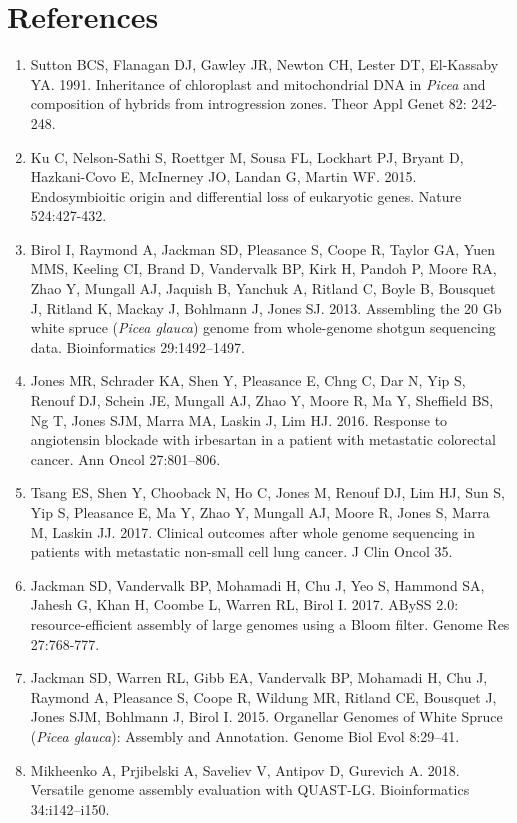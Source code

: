 \documentclass[titlepage,11pt, oneside]{article}   	%
\begin{document}
\section*{References}
\begin{enumerate}
\item Sutton BCS, Flanagan DJ, Gawley JR, Newton CH, Lester DT, El-Kassaby YA. 1991. Inheritance of chloroplast and mitochondrial DNA in \textit{Picea} and composition of hybrids from introgression zones. Theor Appl Genet 82: 242-248.
\item Ku C, Nelson-Sathi S, Roettger M, Sousa FL, Lockhart PJ, Bryant D, Hazkani-Covo E, McInerney JO, Landan G, Martin WF. 2015. Endosymbioitic origin and differential loss of eukaryotic genes. Nature 524:427-432.
\item Birol I, Raymond A, Jackman SD, Pleasance S, Coope R, Taylor GA, Yuen MMS, Keeling CI, Brand D, Vandervalk BP, Kirk H, Pandoh P, Moore RA, Zhao Y, Mungall AJ, Jaquish B, Yanchuk A, Ritland C, Boyle B, Bousquet J, Ritland K, Mackay J, Bohlmann J, Jones SJ. 2013. Assembling the 20 Gb white spruce (\textit{Picea glauca}) genome from whole-genome shotgun sequencing data. Bioinformatics 29:1492–1497.
\item Jones MR, Schrader KA, Shen Y, Pleasance E, Chng C, Dar N, Yip S, Renouf DJ, Schein JE, Mungall AJ, Zhao Y, Moore R, Ma Y, Sheffield BS, Ng T, Jones SJM, Marra MA, Laskin J, Lim HJ. 2016. Response to angiotensin blockade with irbesartan in a patient with metastatic colorectal cancer. Ann Oncol 27:801–806.
\item Tsang ES, Shen Y, Chooback N, Ho C, Jones M, Renouf DJ, Lim HJ, Sun S, Yip S, Pleasance E, Ma Y, Zhao Y, Mungall AJ, Moore R, Jones S, Marra M, Laskin JJ. 2017. Clinical outcomes after whole genome sequencing in patients with metastatic non-small cell lung cancer. J Clin Oncol 35.
\item Jackman SD, Vandervalk BP, Mohamadi H, Chu J, Yeo S, Hammond SA, Jahesh G, Khan H, Coombe L, Warren RL, Birol I. 2017. ABySS 2.0: resource-efficient assembly of large genomes using a Bloom filter. Genome Res 27:768-777.
\item Jackman SD, Warren RL, Gibb EA, Vandervalk BP, Mohamadi H, Chu J, Raymond A, Pleasance S, Coope R, Wildung MR, Ritland CE, Bousquet J, Jones SJM, Bohlmann J, Birol I. 2015. Organellar Genomes of White Spruce (\textit{Picea glauca}): Assembly and Annotation. Genome Biol Evol 8:29–41.
\item Mikheenko A, Prjibelski A, Saveliev V, Antipov D, Gurevich A. 2018. Versatile genome assembly evaluation with QUAST-LG. Bioinformatics 34:i142–i150.

\end{enumerate}
\end{document}
